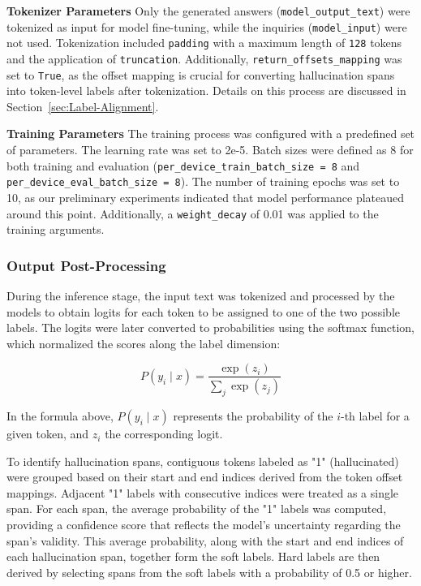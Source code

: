 \documentclass[11pt]{article}
\begin{document}
\textbf{Tokenizer Parameters}  
Only the generated answers (\texttt{model\_output\_text}) were tokenized as input for model fine-tuning, while the inquiries (\texttt{model\_input}) were not used. Tokenization included \texttt{padding} with a maximum length of \texttt{128} tokens and the application of \texttt{truncation}. Additionally, \texttt{return\_offsets\_mapping} was set to \texttt{True}, as the offset mapping is crucial for converting hallucination spans into token-level labels after tokenization. Details on this process are discussed in Section~\ref{sec:Label-Alignment}.


\textbf{Training Parameters}
The training process was configured with a predefined set of parameters. The learning rate was set to 2e-5. Batch sizes were defined as 8 for both training and evaluation (\texttt{per\_device\_train\_batch\_size = 8} and \texttt{per\_device\_eval\_batch\_size = 8}). The number of training epochs was set to 10, as our preliminary experiments indicated that model performance plateaued around this point. Additionally, a \texttt{weight\_decay} of 0.01 was applied to the training arguments.


\subsubsection{Output Post-Processing}
During the inference stage, the input text was tokenized and processed by the models to obtain logits for each token to be assigned to one of the two possible labels. The logits were later converted to probabilities using the softmax function, which normalized the scores along the label dimension:

\[
P(y_i \mid x) = \frac{\exp(z_i)}{\sum_{j} \exp(z_j)}
\]

In the formula above, $P(y_i \mid x)$ represents the probability of the $i$-th label for a given token, and $z_i$ the corresponding logit.

To identify hallucination spans, contiguous tokens labeled as "1" (hallucinated) were grouped based on their start and end indices derived from the token offset mappings. Adjacent "1" labels with consecutive indices were treated as a single span. For each span, the average probability of the "1" labels was computed, providing a confidence score that reflects the model's uncertainty regarding the span's validity. This average probability, along with the start and end indices of each hallucination span, together form the soft labels. Hard labels are then derived by selecting spans from the soft labels with a probability of 0.5 or higher.
   
\end{document}
